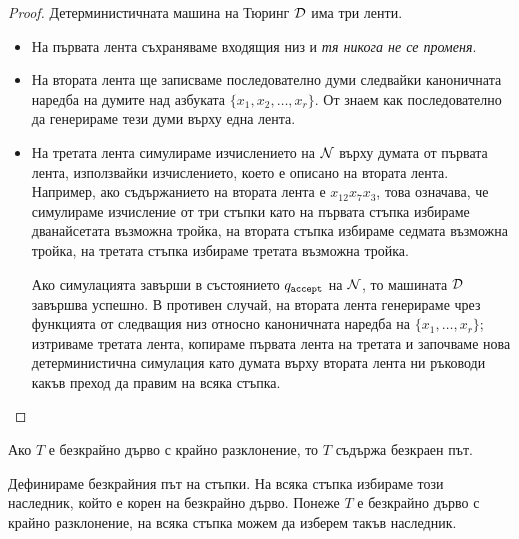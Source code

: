 \begin{proof}
  Детерминистичната машина на Тюринг $\mathcal{D}$ има три ленти.
  \begin{itemize}
  \item 
    На първата лента съхраняваме входящия низ и {\em тя никога не се променя}.
  \item
    На втората лента ще записваме последователно думи следвайки каноничната наредба на 
    думите над азбуката $\{x_1,x_2,\dots,x_r\}$.
    От  знаем как последователно да генерираме тези думи върху една лента.
  \item
    На третата лента симулираме изчислението на $\mathcal{N}$ върху думата от първата лента, използвайки изчислението, 
    което е описано на втората лента. Например, ако съдържанието на втората лента е $x_{12}x_7x_3$,
    това означава, че симулираме изчисление от три стъпки като на първата стъпка избираме дванайсетата
    възможна тройка, на втората стъпка избираме седмата възможна тройка, на третата стъпка избираме третата възможна тройка.
    
    Ако симулацията завърши в състоянието $q_{\texttt{accept}}$ на $\mathcal{N}$, то машината $\mathcal{D}$ завършва успешно.
    В противен случай, на втората лента генерираме чрез функцията от  следващия низ относно каноничната наредба на $\{x_1,\dots,x_r\}$;
    изтриваме третата лента, копираме първата лента на третата и започваме нова детерминистична симулация като думата върху втората лента ни ръководи какъв преход да правим на всяка стъпка.
  \end{itemize}
\end{proof}

\begin{proposition}
  Ако $T$ е безкрайно дърво с крайно разклонение, то $T$ съдържа безкраен път.
\end{proposition}
\begin{hint}
  Дефинираме безкрайния път на стъпки.
  На всяка стъпка избираме този наследник, който е корен на безкрайно дърво.
  Понеже $T$ е безкрайно дърво с крайно разклонение, на всяка стъпка можем да изберем такъв наследник.
\end{hint}

